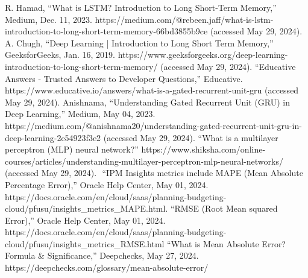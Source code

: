 \documentclass{ieeeojies}
\begin{document}
\begin{thebibliography}{00}
		 R. Hamad, “What is LSTM? Introduction to Long Short-Term Memory,” Medium, Dec. 11, 2023. https://medium.com/@rebeen.jaff/what-is-lstm-introduction-to-long-short-term-memory-66bd3855b9ce (accessed May 29, 2024).
		 A. Chugh, “Deep Learning | Introduction to Long Short Term Memory,” GeeksforGeeks, Jan. 16, 2019. https://www.geeksforgeeks.org/deep-learning-introduction-to-long-short-term-memory/ (accessed May 29, 2024).
		 “Educative Answers - Trusted Answers to Developer Questions,” Educative. https://www.educative.io/answers/what-is-a-gated-recurrent-unit-gru (accessed May 29, 2024).
		 Anishnama, “Understanding Gated Recurrent Unit (GRU) in Deep Learning,” Medium, May 04, 2023. https://medium.com/@anishnama20/understanding-gated-recurrent-unit-gru-in-deep-learning-2e54923f3e2 (accessed May 29, 2024).
		 “What is a multilayer perceptron (MLP) neural network?” https://www.shiksha.com/online-courses/articles/understanding-multilayer-perceptron-mlp-neural-networks/ (accessed May 29, 2024).
		‌ “IPM Insights metrics include MAPE (Mean Absolute Percentage Error),” Oracle Help Center, May 01, 2024. https://docs.oracle.com/en/cloud/saas/planning-budgeting-cloud/pfusu/insights\_metrics\_MAPE.html. 
		 “RMSE (Root Mean squared Error),” Oracle Help Center, May 01, 2024. https://docs.oracle.com/en/cloud/saas/planning-budgeting-cloud/pfusu/insights\_metrics\_RMSE.html
		 “What is Mean Absolute Error? Formula \& Significance,” Deepchecks, May 27, 2024. https://deepchecks.com/glossary/mean-absolute-error/
		
		
	\end{thebibliography}
	
	\EOD
	
\end{document}
